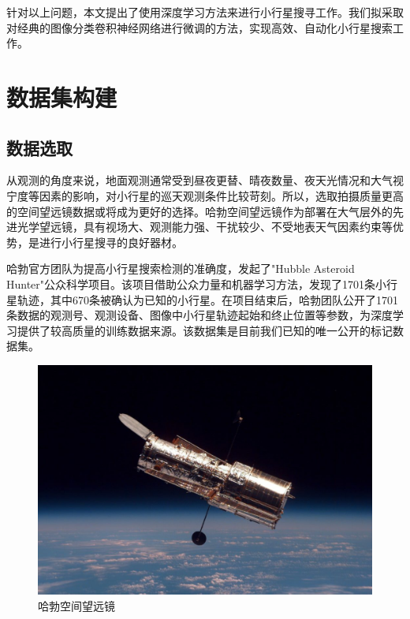 \documentclass[12pt,a4paper]{article}%
\begin{document}
针对以上问题，本文提出了使用深度学习方法来进行小行星搜寻工作。我们拟采取对经典的图像分类卷积神经网络进行微调的方法，实现高效、自动化小行星搜索工作。

\section{数据集构建}

\subsection{数据选取}

从观测的角度来说，地面观测通常受到昼夜更替、晴夜数量、夜天光情况和大气视宁度等因素的影响，对小行星的巡天观测条件比较苛刻。所以，选取拍摄质量更高的空间望远镜数据或将成为更好的选择。哈勃空间望远镜作为部署在大气层外的先进光学望远镜，具有视场大、观测能力强、干扰较少、不受地表天气因素约束等优势，是进行小行星搜寻的良好器材。

哈勃官方团队为提高小行星搜索检测的准确度，发起了"Hubble Asteroid Hunter"公众科学项目。该项目借助公众力量和机器学习方法，发现了1701条小行星轨迹，其中670条被确认为已知的小行星。在项目结束后，哈勃团队公开了1701条数据的观测号、观测设备、图像中小行星轨迹起始和终止位置等参数，为深度学习提供了较高质量的训练数据来源。该数据集是目前我们已知的唯一公开的标记数据集。

\begin{figure}[H]%
    \centering
    \begin{minipage}{0.83\textwidth}%
        \centering
        \includegraphics[width=1.0%
            \textwidth]{hubble}%
        \caption{\fontsize{10pt}{15pt}\selectfont 哈勃空间望远镜}%
    \end{minipage}
\end{figure}
\end{document}
